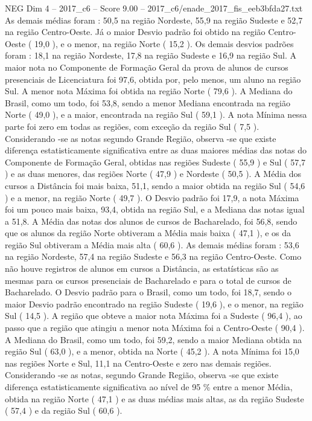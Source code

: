 \begin{textsample}{NEG Dim 4 – 2017\_c6 – Score 9.00 – 2017\_c6/enade\_2017\_fis\_eeb3bfda27.txt}
As demais médias foram : 50,5 na região Nordeste, 55,9 na região Sudeste e 52,7 na região Centro-Oeste.
Já o maior Desvio padrão foi obtido na região Centro-Oeste ( 19,0 ), e o menor, na região Norte ( 15,2 ).
Os demais desvios padrões foram : 18,1 na região Nordeste, 17,8 na região Sudeste e 16,9 na região Sul.
A maior nota no Componente de Formação Geral da prova de alunos de cursos presenciais de Licenciatura foi 97,6, obtida por, pelo menos, um aluno na região Sul.
A menor nota Máxima foi obtida na região Norte ( 79,6 ).
A Mediana do Brasil, como um todo, foi 53,8, sendo a menor Mediana encontrada na região Norte ( 49,0 ), e a maior, encontrada na região Sul ( 59,1 ).
A nota Mínima nessa parte foi zero em todas as regiões, com exceção da região Sul ( 7,5 ).
Considerando -se as notas segundo Grande Região, observa -se que existe diferença estatisticamente significativa entre as duas maiores médias das notas do Componente de Formação Geral, obtidas nas regiões Sudeste ( 55,9 ) e Sul ( 57,7 ) e as duas menores, das regiões Norte ( 47,9 ) e Nordeste ( 50,5 ).
A Média dos cursos a Distância foi mais baixa, 51,1, sendo a maior obtida na região Sul ( 54,6 ) e a menor, na região Norte ( 49,7 ).
O Desvio padrão foi 17,9, a nota Máxima foi um pouco mais baixa, 93,4, obtida na região Sul, e a Mediana das notas igual a 51,8.
A Média das notas dos alunos de cursos de Bacharelado, foi 56,8, sendo que os alunos da região Norte obtiveram a Média mais baixa ( 47,1 ), e os da região Sul obtiveram a Média mais alta ( 60,6 ).
As demais médias foram : 53,6 na região Nordeste, 57,4 na região Sudeste e 56,3 na região Centro-Oeste.
Como não houve registros de alunos em cursos a Distância, as estatísticas são as mesmas para os cursos presenciais de Bacharelado e para o total de cursos de Bacharelado.
O Desvio padrão para o Brasil, como um todo, foi 18,7, sendo o maior Desvio padrão encontrado na região Sudeste ( 19,6 ), e o menor, na região Sul ( 14,5 ).
A região que obteve a maior nota Máxima foi a Sudeste ( 96,4 ), ao passo que a região que atingiu a menor nota Máxima foi a Centro-Oeste ( 90,4 ).
A Mediana do Brasil, como um todo, foi 59,2, sendo a maior Mediana obtida na região Sul ( 63,0 ), e a menor, obtida na Norte ( 45,2 ).
A nota Mínima foi 15,0 nas regiões Norte e Sul, 11,1 na Centro-Oeste e zero nas demais regiões.
Considerando -se as notas, segundo Grande Região, observa -se que existe diferença estatisticamente significativa ao nível de 95 \% entre a menor Média, obtida na região Norte ( 47,1 ) e as duas médias mais altas, as da região Sudeste ( 57,4 ) e da região Sul ( 60,6 ).

\end{textsample}
